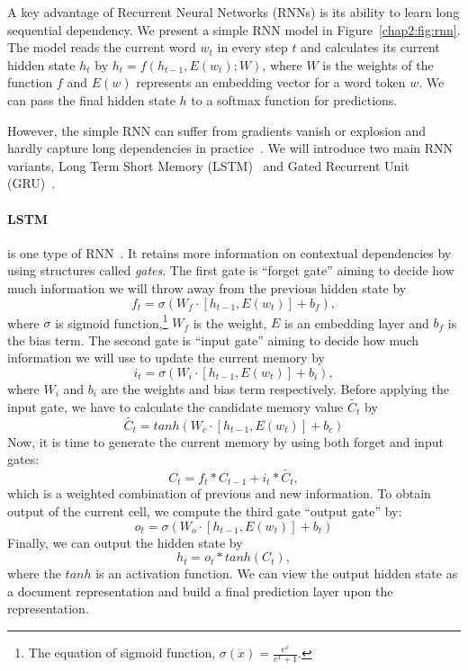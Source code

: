 A key advantage of Recurrent Neural Networks (RNNs) is its ability to learn long sequential dependency. 
We present a simple RNN model in Figure~\ref{chap2:fig:rnn}.
The model reads the current word $w_t$ in every step $t$ and calculates its current hidden state $h_t$ by $h_t = f(h_{t-1}, E(w_t); W)$, where $W$ is the weights of the function $f$ and $E(w)$ represents an embedding vector for a word token $w$.
We can pass the final hidden state $h$ to a softmax function for predictions.

However, the simple RNN can suffer from gradients vanish or explosion and hardly capture long dependencies in practice~\cite{pascanu2013difficulty}.
We will introduce two main RNN variants, Long Term Short Memory (LSTM)~\cite{hochreiter1997long} and Gated Recurrent Unit (GRU)~\cite{chung2014empirical}.

\paragraph{LSTM} is one type of RNN~\cite{hochreiter1997long}. 
It retains more information on contextual dependencies by using structures called \textit{gates}.
The first gate is ``forget gate'' aiming to decide how much information we will throw away from the previous hidden state by 
$$f_t = \sigma(W_f \cdot [h_{t-1}, E(w_t)] + b_f),$$
where $\sigma$ is sigmoid function,\footnote{The equation of sigmoid function, $\sigma(x) = \frac{e^x}{e^x+1}$.} $W_f$ is the weight, $E$ is an embedding layer and $b_f$ is the bias term.
The second gate is ``input gate'' aiming to decide how much information we will use to update the current memory by
$$i_t = \sigma(W_i \cdot [h_{t-1}, E(w_t)] + b_i),$$
where $W_i$ and $b_i$ are the weights and bias term respectively.
Before applying the input gate, we have to calculate the candidate memory value $\tilde{C_t}$ by $$\tilde{C_t} = tanh(W_c \cdot [h_{t-1}, E(w_t)] + b_c)$$
Now, it is time to generate the current memory by using both forget and input gates:
$$C_t = f_t * C_{t-1} + i_t * \tilde{C_t},$$ 
which is a weighted combination of previous and new information.
To obtain output of the current cell, we compute the third gate ``output gate'' by:
$$o_t = \sigma(W_o \cdot [h_{t-1}, E(w_t)] + b_t)$$
Finally, we can output the hidden state by $$h_t = o_t * tanh(C_t),$$ 
where the $tanh$ is an activation function.
We can view the output hidden state as a document representation and build a final prediction layer upon the representation.



